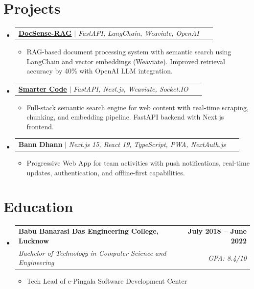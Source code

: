 \documentclass[letterpaper,11pt]{article}
\makeatletter
\newcommand{\resumeItem}[1]{
  \item\small{
    {#1 \vspace{-2pt}}
  }
}
\newcommand{\resumeSubheading}[4]{
  \vspace{-2pt}\item
    \begin{tabular*}{1.0\textwidth}[t]{l@{\extracolsep{\fill}}r}
      \textbf{#1} & \textbf{\small #2} \\
      \textit{\small#3} & \textit{\small #4} \\
    \end{tabular*}\vspace{-7pt}
}
\newcommand{\resumeProjectHeading}[2]{
    \item
    \begin{tabular*}{1.001\textwidth}{l@{\extracolsep{\fill}}r}
      \small#1 & \textbf{\small #2}\
    \end{tabular*}\vspace{-7pt}
}
\newcommand{\resumeSubHeadingListStart}{\begin{itemize}[leftmargin=0.0in, label={}]}
\newcommand{\resumeSubHeadingListEnd}{\end{itemize}}
\newcommand{\resumeItemListStart}{\begin{itemize}}
\newcommand{\resumeItemListEnd}{\end{itemize}\vspace{-5pt}}
\makeatother
\begin{document}
\section{Projects}
    \vspace{-5pt}
    \resumeSubHeadingListStart
    
      \resumeProjectHeading
          {\textbf{\href{https://github.com/codecraft26/DocSense-RAG}{DocSense-RAG}} $|$ \emph{FastAPI, LangChain, Weaviate, OpenAI}}{}
          \resumeItemListStart
            \resumeItem{RAG-based document processing system with semantic search using LangChain and vector embeddings (Weaviate). Improved retrieval accuracy by 40\% with OpenAI LLM integration.}
          \resumeItemListEnd
          \vspace{-10pt}
          
      \resumeProjectHeading
          {\textbf{\href{https://github.com/codecraft26/smarter.codes}{Smarter Code}} $|$ \emph{FastAPI, Next.js, Weaviate, Socket.IO}}{}
          \resumeItemListStart
            \resumeItem{Full-stack semantic search engine for web content with real-time scraping, chunking, and embedding pipeline. FastAPI backend with Next.js frontend.}
          \resumeItemListEnd
          \vspace{-10pt}
          
      \resumeProjectHeading
          {\textbf{Bann Dhann} $|$ \emph{Next.js 15, React 19, TypeScript, PWA, NextAuth.js}}{}
          \resumeItemListStart
            \resumeItem{Progressive Web App for team activities with push notifications, real-time updates, authentication, and offline-first capabilities.}
          \resumeItemListEnd
          
    \resumeSubHeadingListEnd
\vspace{-15pt}

\section{Education}
  \resumeSubHeadingListStart
    \resumeSubheading
      {Babu Banarasi Das Engineering College, Lucknow}{July 2018 -- June 2022}
      {Bachelor of Technology in Computer Science and Engineering}{GPA: 8.4/10}
      \resumeItemListStart
        \resumeItem{Tech Lead of e-Pingala Software Development Center}
      \resumeItemListEnd
  \resumeSubHeadingListEnd
\end{document}

